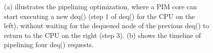 \begin{figure}[ht!]
\centering
{}

\caption{(a) illustrates the pipelining optimization, where a PIM core can start executing 
a new deq() (step 1 of deq() for the CPU on the left), without waiting for the dequeued node of 
the previous deq() to return to the CPU on the right (step 3). 
(b) shows the timeline of pipelining four deq() requests.}
\label{figure:queue_pipeline}
\end{figure}

